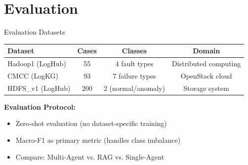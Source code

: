 \documentclass[aspectratio=169]{beamer}
\begin{document}
\section{Evaluation}

\begin{frame}{Evaluation Datasets}
\begin{table}
\centering
\begin{tabular}{lccc}
\toprule
\textbf{Dataset} & \textbf{Cases} & \textbf{Classes} & \textbf{Domain} \\
\midrule
Hadoop1 (LogHub) & 55 & 4 fault types & Distributed computing \\
CMCC (LogKG) & 93 & 7 failure types & OpenStack cloud \\
HDFS\_v1 (LogHub) & 200 & 2 (normal/anomaly) & Storage system \\
\bottomrule
\end{tabular}
\end{table}

\vspace{1em}
\textbf{Evaluation Protocol:}
\begin{itemize}
    \item Zero-shot evaluation (no dataset-specific training)
    \item Macro-F1 as primary metric (handles class imbalance)
    \item Compare: Multi-Agent vs. RAG vs. Single-Agent
\end{itemize}
\end{frame}
\end{document}
